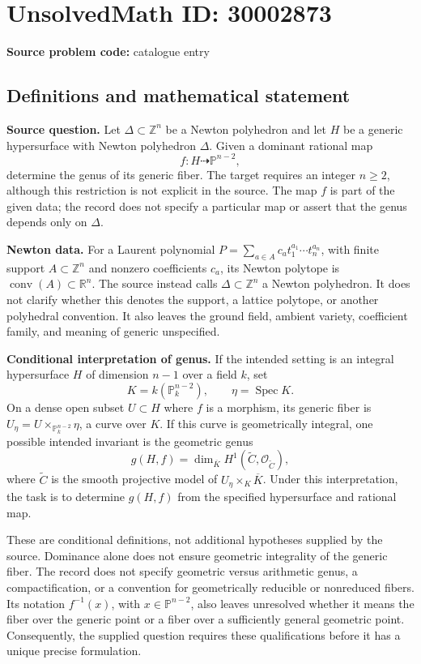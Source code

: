 \documentclass[11pt]{article}
\newcommand{\Z}{\mathbb{Z}}
\newcommand{\R}{\mathbb{R}}
\newcommand{\PP}{\mathbb{P}}
\begin{document}
\section*{UnsolvedMath ID: 30002873}
\textbf{Source problem code:} catalogue entry
\subsection{Definitions and mathematical statement}
\textbf{Source question.} Let \(\Delta\subset\Z^n\) be a Newton polyhedron and let \(H\) be a generic hypersurface with Newton polyhedron \(\Delta\). Given a dominant rational map
\[
f:H\dashrightarrow\PP^{n-2},
\]
determine the genus of its generic fiber. The target requires an integer \(n\geq 2\), although this restriction is not explicit in the source. The map \(f\) is part of the given data; the record does not specify a particular map or assert that the genus depends only on \(\Delta\).

\textbf{Newton data.} For a Laurent polynomial \(P=\sum_{a\in A}c_a t_1^{a_1}\cdots t_n^{a_n}\), with finite support \(A\subset\Z^n\) and nonzero coefficients \(c_a\), its Newton polytope is \(\operatorname{conv}(A)\subset\R^n\). The source instead calls \(\Delta\subset\Z^n\) a Newton polyhedron. It does not clarify whether this denotes the support, a lattice polytope, or another polyhedral convention. It also leaves the ground field, ambient variety, coefficient family, and meaning of generic unspecified.

\textbf{Conditional interpretation of genus.} If the intended setting is an integral hypersurface \(H\) of dimension \(n-1\) over a field \(k\), set
\[
K=k(\PP_k^{n-2}),\qquad \eta=\operatorname{Spec}K.
\]
On a dense open subset \(U\subset H\) where \(f\) is a morphism, its generic fiber is \(U_\eta=U\times_{\PP_k^{n-2}}\eta\), a curve over \(K\). If this curve is geometrically integral, one possible intended invariant is the geometric genus
\[
g(H,f)=\dim_{\overline K}H^1(\widetilde C,\mathcal O_{\widetilde C}),
\]
where \(\widetilde C\) is the smooth projective model of \(U_\eta\times_K\overline K\). Under this interpretation, the task is to determine \(g(H,f)\) from the specified hypersurface and rational map.

These are conditional definitions, not additional hypotheses supplied by the source. Dominance alone does not ensure geometric integrality of the generic fiber. The record does not specify geometric versus arithmetic genus, a compactification, or a convention for geometrically reducible or nonreduced fibers. Its notation \(f^{-1}(x)\), with \(x\in\PP^{n-2}\), also leaves unresolved whether it means the fiber over the generic point or a fiber over a sufficiently general geometric point. Consequently, the supplied question requires these qualifications before it has a unique precise formulation.
\end{document}
